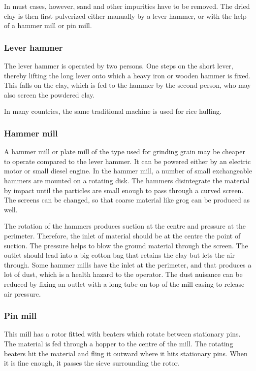 In must cases, however, sand and other impurities have to be removed. The dried 
clay is then first pulverized either manually by a lever hammer, or with the 
help of a hammer mill or pin mill.
\subsubsection{Lever hammer}
The lever hammer is operated by two persons. One steps on the short lever, 
thereby lifting the long lever onto which a heavy iron or wooden hammer is 
fixed. This falls on the clay, which is fed to the hammer by the second person, 
who may also screen the powdered clay.

In many countries, the same traditional machine is used for rice hulling.
\subsubsection{Hammer mill}
A hammer mill or plate mill of the type used for grinding grain may be cheaper 
to operate compared to the lever hammer. It can be powered either by an 
electric motor or small diesel engine. In the hammer mill, a number of small 
exchangeable hammers are mounted on a rotating disk. The hammers disintegrate 
the material by impact until the particles are small enough to pass through a 
curved screen. The screens can be changed, so that coarse material like grog 
can be produced as well.

The rotation of the hammers produces suction at the centre and pressure at the 
perimeter. Therefore, the inlet of material should be at the centre the point 
of suction. The pressure helps to blow the ground material through the screen. 
The outlet should lead into a big cotton bag that retains the clay but lets the 
air through. Some hammer mills have the inlet at the perimeter, and that 
produces a lot of dust, which is a health hazard to the operator. The dust 
nuisance can be reduced by fixing an outlet with a long tube on top of the mill 
casing to release air pressure.
\subsubsection{Pin mill}
This mill has a rotor fitted with beaters which rotate between stationary pins. 
The material is fed through a hopper to the centre of the mill. The rotating 
beaters hit the material and fling it outward where it hits stationary pins. 
When it is fine enough, it passes the sieve surrounding the rotor.

